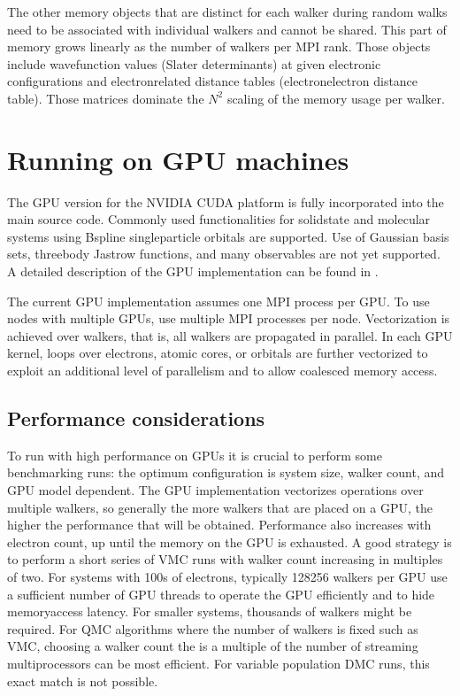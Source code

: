 \documentclass[letterpaper,10pt,english]{sphinxmanual}
\begin{document}
The other memory objects that are distinct for each walker during random walks need to be
associated with individual walkers and cannot be shared. This part of memory grows linearly as the number of walkers per MPI rank. Those objects include wavefunction values (Slater determinants) at given electronic configurations and electron\sphinxhyphen{}related distance tables (electron\sphinxhyphen{}electron distance table). Those matrices dominate the \(N^2\) scaling of the memory usage per walker.


\section{Running on GPU machines}
\label{\detokenize{running:running-on-gpu-machines}}\label{\detokenize{running:gpurunning}}
The GPU version for the NVIDIA CUDA platform is fully incorporated into
the main source code. Commonly used functionalities for
solid\sphinxhyphen{}state and molecular systems using B\sphinxhyphen{}spline single\sphinxhyphen{}particle
orbitals are supported. Use of Gaussian basis sets, three\sphinxhyphen{}body
Jastrow functions, and many observables are not yet supported. A detailed description of the GPU
implementation can be found in .

The current GPU implementation assumes one MPI process per GPU. To use
nodes with multiple GPUs, use multiple MPI processes per node.
Vectorization is achieved over walkers, that is, all walkers are
propagated in parallel. In each GPU kernel, loops over electrons,
atomic cores, or orbitals are further vectorized to exploit an
additional level of parallelism and to allow coalesced memory access.


\subsection{Performance considerations}
\label{\detokenize{running:gpu-performance}}\label{\detokenize{running:id2}}
To run with high performance on GPUs it is crucial to perform some
benchmarking runs: the optimum configuration is system size, walker
count, and GPU model dependent. The GPU implementation vectorizes
operations over multiple walkers, so generally the more walkers that
are placed on a GPU, the higher the performance that will be
obtained. Performance also increases with electron count, up until the
memory on the GPU is exhausted. A good strategy is to perform a short
series of VMC runs with walker count increasing in multiples of
two. For systems with 100s of electrons, typically 128\textendash{}256 walkers per
GPU use a sufficient number of GPU threads to operate the GPU
efficiently and to hide memory\sphinxhyphen{}access latency. For smaller systems,
thousands of walkers might be required. For QMC algorithms where the number of
walkers is fixed such as VMC, choosing a walker count the is a multiple of the
number of streaming multiprocessors can be most efficient. For
variable population DMC runs, this exact match is not possible.
\end{document}
